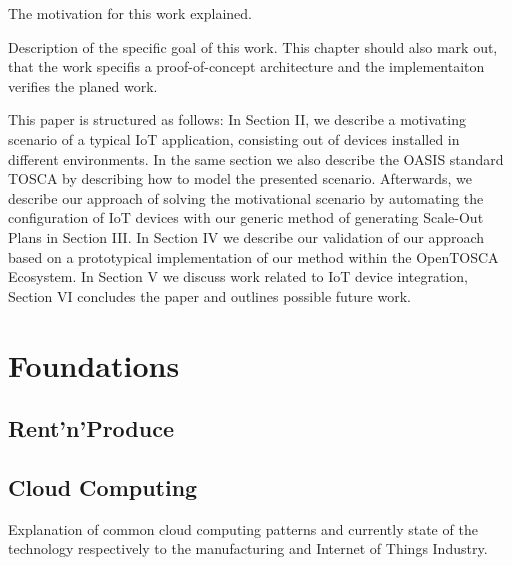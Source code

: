 \documentclass[
a4paper,
twoside,
bibliography=totoc,
headsepline,
cleardoublepage=empty,
parskip=half,
draft=false
]{scrbook}
\begin{document}
		
		
		
		The motivation for this work explained.
		
		
		
				
		Description of the specific goal of this work. 
		This chapter should also mark out, that the work specifis a proof-of-concept architecture and the implementaiton verifies the planed work.
		
		
		
		
		This paper is structured as follows: In Section II, we
		describe a motivating scenario of a typical IoT application,
		consisting out of devices installed in different environments. In
		the same section we also describe the OASIS standard TOSCA
		by describing how to model the presented scenario. Afterwards,
		we describe our approach of solving the motivational
		scenario by automating the configuration of IoT devices with
		our generic method of generating Scale-Out Plans in Section
		III. In Section IV we describe our validation of our approach
		based on a prototypical implementation of our method within
		the OpenTOSCA Ecosystem. In Section V we discuss work
		related to IoT device integration, Section VI concludes the
		paper and outlines possible future work.
			
			
	\chapter{Foundations}\label{ch:foundations}
	
		\section{Rent'n'Produce}\label{sec:rent_n_produce}
		
		\section{Cloud Computing}\label{sec:cloud_computing}
		
			Explanation of common cloud computing patterns and currently state of the technology respectively to the manufacturing and Internet of Things Industry.~\cite{mell2011nist}
		
\end{document}
